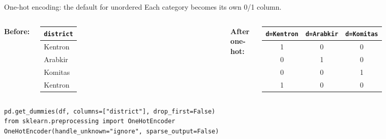 \documentclass[aspectratio=169]{beamer}
\begin{document}
\begin{frame}[fragile]{One-hot encoding: the default for unordered}
  Each category becomes its own 0/1 column.
  \vfill
  \begin{columns}[T]
    \textbf{Before:}
    \begin{tabular}{l}
      \texttt{district} \\ \hline
      Kentron \\
      Arabkir \\
      Komitas \\
      Kentron
    \end{tabular}
    \textbf{After one-hot:}
    \begin{tabular}{ccc}
      \texttt{d=Kentron} & \texttt{d=Arabkir} & \texttt{d=Komitas} \\ \hline
      1 & 0 & 0 \\
      0 & 1 & 0 \\
      0 & 0 & 1 \\
      1 & 0 & 0
    \end{tabular}
  \end{columns}
  \vfill
\begin{lstlisting}
pd.get_dummies(df, columns=["district"], drop_first=False)
from sklearn.preprocessing import OneHotEncoder
OneHotEncoder(handle_unknown="ignore", sparse_output=False)
\end{lstlisting}
  \vfill
\end{frame}
\end{document}
